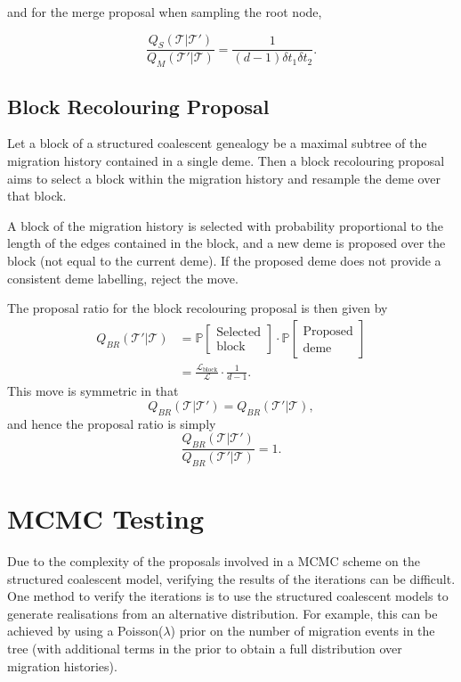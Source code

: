 \documentclass[12pt,a4paper]{article}
\newcommand{\calL}{\mathcal{L}}
\newcommand{\calT}{\mathcal{T}}
\newcommand{\bbP}{\mathbb{P}}
\begin{document}
				and for the merge proposal when sampling the root node,
				
				\[
					\frac{Q_S(\calT | \calT')}{Q_M (\calT' | \calT)} = \frac{1}{(d-1) \delta t_1 \delta t_2}.
				\]
				
		\subsection{Block Recolouring Proposal}
			Let a block of a structured coalescent genealogy be a maximal subtree of the migration history contained in a single deme. Then a block recolouring proposal aims to select a block within the migration history and resample the deme over that block.
			
			A block of the migration history is selected with probability proportional to the length of the edges contained in the block, and a new deme is proposed over the block (not equal to the current deme). If the proposed deme does not provide a consistent deme labelling, reject the move.
			
			The proposal ratio for the block recolouring proposal is then given by
				\begin{align*}
					Q_{BR}(\calT' | \calT) & = \bbP [\substack{\text{Selected} \\ \text{block}}] \cdot \bbP [\substack{\text{Proposed} \\ \text{deme}}] \\
						& = \frac{\calL_\text{block}}{\calL} \cdot \frac{1}{d-1}.
				\end{align*}
			This move is symmetric in that
				\[
					Q_{BR} (\calT | \calT') = Q_{BR}(\calT' | \calT),
				\]
			and hence the proposal ratio is simply
				\[
					\frac{Q_{BR} (\calT | \calT')}{Q_{BR} (\calT' | \calT)} = 1.
				\]
			
	\section{MCMC Testing}
		Due to the complexity of the proposals involved in a MCMC scheme on the structured coalescent model, verifying the results of the iterations can be difficult. One method to verify the iterations is to use the structured coalescent models to generate realisations from an alternative distribution. For example, this can be achieved by using a Poisson($\lambda$) prior on the number of migration events in the tree (with additional terms in the prior to obtain a full distribution over migration histories).
		
\end{document}
